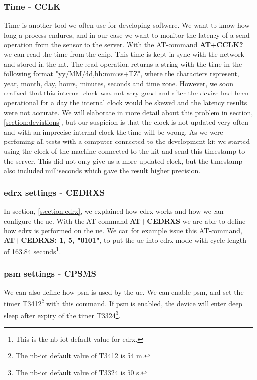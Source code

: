\documentclass[USenglish]{ifimaster}  %
\begin{document}
\subsubsection{Time - CCLK} \label{ssection:timecclk}
Time is another tool we often use for developing software. We want to know how long a process endures, and in our case we want to monitor the latency of a send operation from the sensor to the server. With the AT-command \textbf{AT+CCLK?} we can read the time from the chip. This time is kept in sync with the network and stored in the \acrshort{mt}. The read operation returns a string with the time in the following format "yy/MM/dd,hh:mm:ss+TZ", where the characters represent, year, month, day, hours, minutes, seconds and time zone. However, we soon realised that this internal clock was not very good and after the device had been operational for a day the internal clock would be skewed and the latency results were not accurate. We will elaborate in more detail about this problem in section, \vref{section:deviations}, but our suspicion is that the clock is not updated very often and with an imprecise internal clock the time will be wrong. As we were perfoming all tests with a computer connected to the development kit we started using the clock of the machine connected to the kit and send this timestamp to the server. This did not only give us a more updated clock, but the timestamp also included milliseconds which gave the result higher precision.

\subsubsection{\acrshort{edrx} settings - CEDRXS}
In section, \vref{ssection:edrx}, we explained how \acrshort{edrx} works and how we can configure the \acrshort{ue}. With the AT-command \textbf{AT+CEDRXS} we are able to define how \acrshort{edrx} is performed on the \acrshort{ue}. We can for example issue this AT-command, \textbf{AT+CEDRXS: 1, 5, "0101"}, to put the \acrshort{ue} into \acrshort{edrx} mode with cycle length of 163.84 seconds\footnote{This is the \acrshort{nb-iot} default value for \acrshort{edrx}.}.

\subsubsection{\acrshort{psm} settings - CPSMS}
We can also define how \acrshort{psm} is used by the \acrshort{ue}. We can enable \acrshort{psm}, and set the timer \acrfull{T3412}\footnote{The \acrshort{nb-iot} default value of \acrshort{T3412} is 54 m.\cite{atcommand:ubloxchip}} with this command. If \acrshort{psm} is enabled, the device will enter deep sleep after expiry of the timer \acrfull{T3324}\footnote{The \acrshort{nb-iot} default value of \acrshort{T3324} is 60 s.}.
\end{document}
